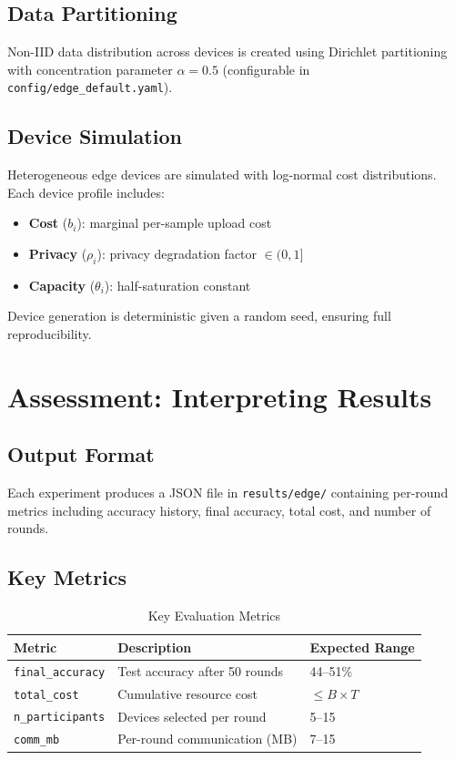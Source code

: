 \documentclass[conference]{IEEEtran}
\begin{document}
\subsection{Data Partitioning}

Non-IID data distribution across devices is created using Dirichlet partitioning with concentration parameter $\alpha = 0.5$ (configurable in \texttt{config/edge\_default.yaml}).

\subsection{Device Simulation}

Heterogeneous edge devices are simulated with log-normal cost distributions.
Each device profile includes:
\begin{itemize}[noitemsep]
  \item \textbf{Cost} ($b_i$): marginal per-sample upload cost
  \item \textbf{Privacy} ($\rho_i$): privacy degradation factor $\in (0, 1]$
  \item \textbf{Capacity} ($\theta_i$): half-saturation constant
\end{itemize}
Device generation is deterministic given a random seed, ensuring full reproducibility.

\section{Assessment: Interpreting Results}

\subsection{Output Format}

Each experiment produces a JSON file in \texttt{results/edge/} containing per-round metrics including accuracy history, final accuracy, total cost, and number of rounds.

\subsection{Key Metrics}

\begin{table}[h]
\centering
\caption{Key Evaluation Metrics}
\label{tab:metrics}
\begin{tabular}{@{}lll@{}}
\toprule
Metric & Description & Expected Range \\
\midrule
\texttt{final\_accuracy} & Test accuracy after 50 rounds & 44--51\% \\
\texttt{total\_cost}     & Cumulative resource cost      & $\leq B \times T$ \\
\texttt{n\_participants} & Devices selected per round     & 5--15 \\
\texttt{comm\_mb}        & Per-round communication (MB)   & 7--15 \\
\bottomrule
\end{tabular}
\end{table}
\end{document}
